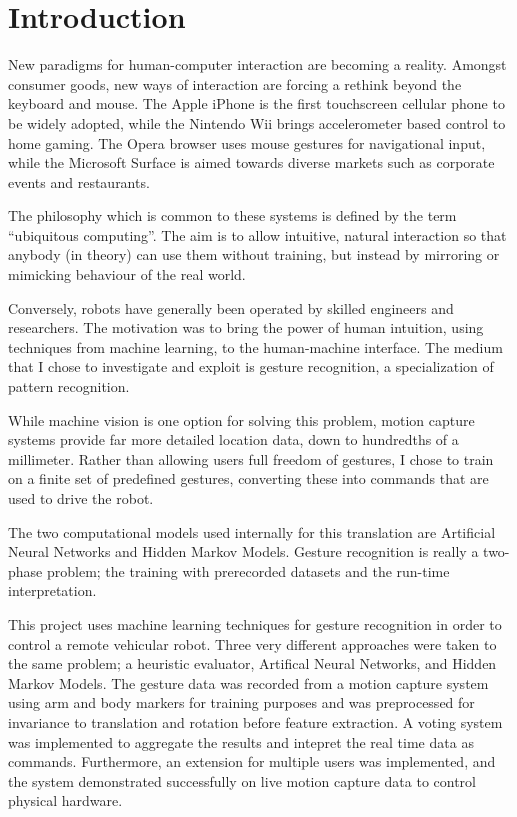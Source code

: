 \documentclass[12pt,a4,notitlepage]{report}
\renewcommand{\_}{\texttt{\symbol{95}}}
\newcommand{\<}{\texttt{\symbol{60}}}
\renewcommand{\>}{\texttt{\symbol{62}}}
\begin{document}
\cleardoublepage        %

\setcounter{page}{1}
\pagestyle{headings}

\chapter{Introduction}

New paradigms for human-computer interaction are becoming a reality. Amongst consumer goods, new ways of interaction are forcing a rethink beyond the keyboard and mouse. The Apple iPhone is the first touchscreen cellular phone to be widely adopted, while the Nintendo Wii brings accelerometer based control to home gaming. The Opera browser uses mouse gestures for navigational input, while the Microsoft Surface is aimed towards diverse markets such as corporate events and restaurants.

The philosophy which is common to these systems is defined by the term ``ubiquitous computing''. The aim is to allow intuitive, natural interaction so that anybody (in theory) can use them without training, but instead by mirroring or mimicking behaviour of the real world.

Conversely, robots have generally been operated by skilled engineers and researchers. The motivation was to bring the power of human intuition, using techniques from machine learning, to the human-machine interface. The medium that I chose to investigate and exploit is gesture recognition, a specialization of pattern recognition.

While machine vision is one option for solving this problem, motion capture systems provide far more detailed location data, down to hundredths of a millimeter. Rather than allowing users full freedom of gestures, I chose to train on a finite set of predefined gestures, converting these into commands that are used to drive the robot. 

The two computational models used internally for this translation are Artificial Neural Networks and Hidden Markov Models. Gesture recognition is really a two-phase problem; the training with prerecorded datasets and the run-time interpretation. 

This project uses machine learning techniques for gesture recognition in order to control a remote vehicular robot. Three very different approaches were taken to the same problem; a heuristic evaluator, Artifical Neural Networks, and Hidden Markov Models. The gesture data was recorded from a motion capture system using arm and body markers for training purposes and was preprocessed for invariance to translation and rotation before feature extraction. A voting system was implemented to aggregate the results and intepret the real time data as commands. Furthermore, an extension for multiple users was implemented, and the system demonstrated successfully on live motion capture data to control physical hardware.
\end{document}

